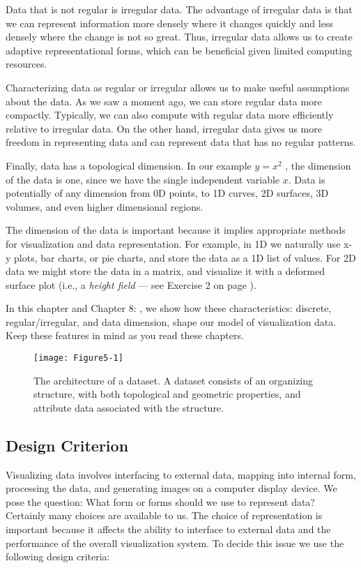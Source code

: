 Data that is not regular is irregular data. The advantage of irregular data is that we can represent information more densely where it changes quickly and less densely where the change is not so great. Thus, irregular data allows us to create adaptive representational forms, which can be beneficial given limited computing resources.

Characterizing data as regular or irregular allows us to make useful assumptions about the data. As we saw a moment ago, we can store regular data more compactly. Typically, we can also compute with regular data more efficiently relative to irregular data. On the other hand, irregular data gives us more freedom in representing data and can represent data that has no regular patterns.

Finally, data has a topological dimension. In our example $y = x^2$ , the dimension of the data is one, since we have the single independent variable $x$. Data is potentially of any dimension from 0D points, to 1D curves, 2D surfaces, 3D volumes, and even higher dimensional regions.

The dimension of the data is important because it implies appropriate methods for visualization and data representation. For example, in 1D we naturally use x-y plots, bar charts, or pie charts, and store the data as a 1D list of values. For 2D data we might store the data in a matrix, and visualize it with a deformed surface plot (i.e., a \emph{height field} --- see Exercise 2 on page \pageref{ex:ch04_4.2}).

In this chapter and Chapter 8: , we show how these characteristics: discrete, regular/irregular, and data dimension, shape our model of visualization data. Keep these features in mind as you read these chapters.

\begin{figure}[!htb]
	\centering
	\texttt{[image: Figure5-1]}
	\caption{The architecture of a dataset. A dataset consists of an organizing structure, with both topological and geometric properties, and attribute data associated with the structure.}
	\label{fig:Figure5-1}
\end{figure}

\subsection{Design Criterion}

Visualizing data involves interfacing to external data, mapping into internal form, processing the data, and generating images on a computer display device. We pose the question: What form or forms should we use to represent data? Certainly many choices are available to us. The choice of representation is important because it affects the ability to interface to external data and the performance of the overall visualization system. To decide this issue we use the following design criteria:

